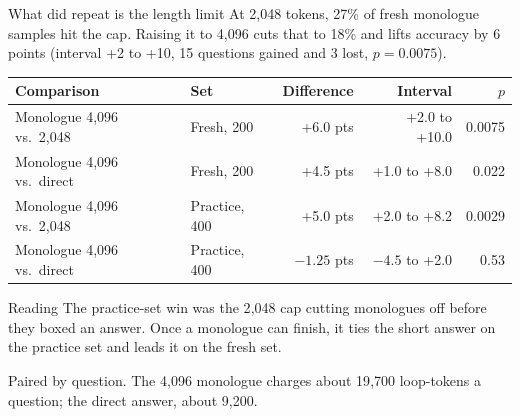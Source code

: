 \documentclass[aspectratio=169,11pt]{beamer}
\newcommand{\src}[1]{\par\vfill\begin{minipage}{0.96\textwidth}\color{muted}\tiny #1\end{minipage}\vspace{-0.2em}}
\begin{document}
\begin{frame}{What did repeat is the length limit}
  At 2{,}048 tokens, 27\% of fresh monologue samples hit the cap.
  Raising it to 4{,}096 cuts that to 18\% and lifts accuracy by 6 points
  (interval +2 to +10, 15 questions gained and 3 lost, $p = 0.0075$).
  \vspace{0.2em}
  {\scriptsize
  \renewcommand{\arraystretch}{1.12}
  \begin{tabular}{@{}l l r r r@{}}
    \toprule
    \textbf{Comparison} & \textbf{Set} & \textbf{Difference} & \textbf{Interval} & \textbf{$p$} \\
    \midrule
    Monologue 4{,}096 vs.\ 2{,}048 & Fresh, 200 & +6.0 pts & +2.0 to +10.0 & 0.0075 \\
    Monologue 4{,}096 vs.\ direct & Fresh, 200 & +4.5 pts & +1.0 to +8.0 & 0.022 \\
    \addlinespace
    Monologue 4{,}096 vs.\ 2{,}048 & Practice, 400 & +5.0 pts & +2.0 to +8.2 & 0.0029 \\
    Monologue 4{,}096 vs.\ direct & Practice, 400 & $-1.25$ pts & $-4.5$ to +2.0 & 0.53 \\
    \bottomrule
  \end{tabular}}
  \vspace{0.25em}
  \begin{block}{Reading}
    \small The practice-set win was the 2{,}048 cap cutting monologues off before they boxed an answer.
    Once a monologue can finish, it ties the short answer on the practice set and leads it on the fresh set.
  \end{block}
  \src{Paired by question. The 4{,}096 monologue charges about 19{,}700 loop-tokens a question; the direct answer, about 9{,}200.}
\end{frame}
\end{document}
